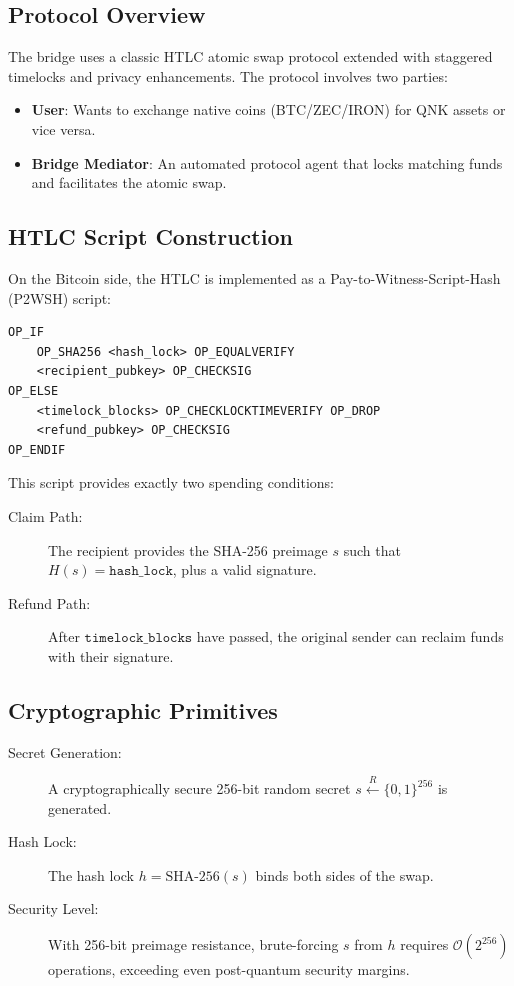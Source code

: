 \documentclass[11pt,a4paper]{article}
\begin{document}
\subsection{Protocol Overview}

The bridge uses a classic HTLC atomic swap protocol extended with staggered timelocks and privacy enhancements. The protocol involves two parties:

\begin{itemize}
    \item \textbf{User}: Wants to exchange native coins (BTC/ZEC/IRON) for QNK assets or vice versa.
    \item \textbf{Bridge Mediator}: An automated protocol agent that locks matching funds and facilitates the atomic swap.
\end{itemize}

\subsection{HTLC Script Construction}

On the Bitcoin side, the HTLC is implemented as a Pay-to-Witness-Script-Hash (P2WSH) script:

\begin{lstlisting}[language={},title={Bitcoin HTLC Script (P2WSH)}]
OP_IF
    OP_SHA256 <hash_lock> OP_EQUALVERIFY
    <recipient_pubkey> OP_CHECKSIG
OP_ELSE
    <timelock_blocks> OP_CHECKLOCKTIMEVERIFY OP_DROP
    <refund_pubkey> OP_CHECKSIG
OP_ENDIF
\end{lstlisting}

This script provides exactly two spending conditions:

\begin{description}
    \item[Claim Path:] The recipient provides the SHA-256 preimage $s$ such that $H(s) = \texttt{hash\_lock}$, plus a valid signature.
    \item[Refund Path:] After $\texttt{timelock\_blocks}$ have passed, the original sender can reclaim funds with their signature.
\end{description}

\subsection{Cryptographic Primitives}

\begin{description}
    \item[Secret Generation:] A cryptographically secure 256-bit random secret $s \xleftarrow{R} \{0,1\}^{256}$ is generated.
    \item[Hash Lock:] The hash lock $h = \text{SHA-256}(s)$ binds both sides of the swap.
    \item[Security Level:] With 256-bit preimage resistance, brute-forcing $s$ from $h$ requires $\mathcal{O}(2^{256})$ operations, exceeding even post-quantum security margins.
\end{description}
\end{document}
